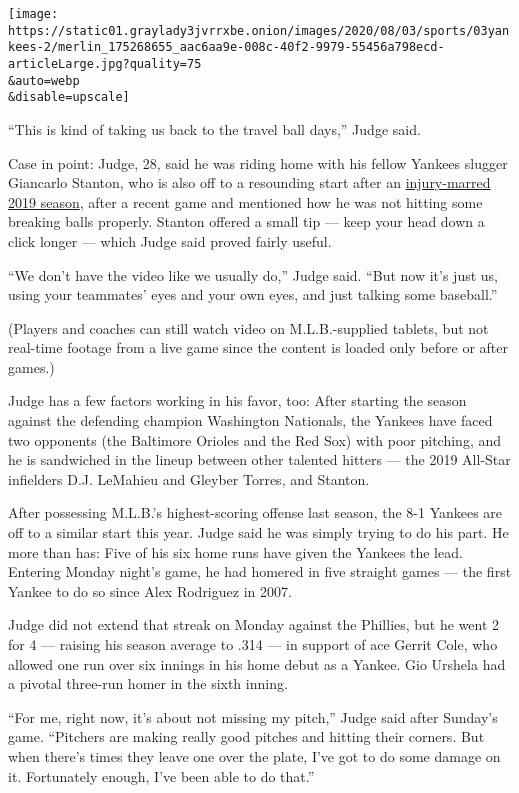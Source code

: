 \texttt{[image: https://static01.graylady3jvrrxbe.onion/images/2020/08/03/sports/03yankees-2/merlin\_175268655\_aac6aa9e-008c-40f2-9979-55456a798ecd-articleLarge.jpg?quality=75\\\&auto=webp\\\&disable=upscale]}

``This is kind of taking us back to the travel ball days,'' Judge said.

Case in point: Judge, 28, said he was riding home with his fellow
Yankees slugger Giancarlo Stanton, who is also off to a resounding start
after an
\href{https://www.nytimes3xbfgragh.onion/2019/09/18/sports/baseball/giancarlo-stanton-yankees.html}{injury-marred
2019 season}, after a recent game and mentioned how he was not hitting
some breaking balls properly. Stanton offered a small tip --- keep your
head down a click longer --- which Judge said proved fairly useful.

``We don't have the video like we usually do,'' Judge said. ``But now
it's just us, using your teammates' eyes and your own eyes, and just
talking some baseball.''

(Players and coaches can still watch video on M.L.B.-supplied tablets,
but not real-time footage from a live game since the content is loaded
only before or after games.)

Judge has a few factors working in his favor, too: After starting the
season against the defending champion Washington Nationals, the Yankees
have faced two opponents (the Baltimore Orioles and the Red Sox) with
poor pitching, and he is sandwiched in the lineup between other talented
hitters --- the 2019 All-Star infielders D.J. LeMahieu and Gleyber
Torres, and Stanton.

After possessing M.L.B.'s highest-scoring offense last season, the 8-1
Yankees are off to a similar start this year. Judge said he was simply
trying to do his part. He more than has: Five of his six home runs have
given the Yankees the lead. Entering Monday night's game, he had homered
in five straight games --- the first Yankee to do so since Alex
Rodriguez in 2007.

Judge did not extend that streak on Monday against the Phillies, but he
went 2 for 4 --- raising his season average to .314 --- in support of
ace Gerrit Cole, who allowed one run over six innings in his home debut
as a Yankee. Gio Urshela had a pivotal three-run homer in the sixth
inning.

``For me, right now, it's about not missing my pitch,'' Judge said after
Sunday's game. ``Pitchers are making really good pitches and hitting
their corners. But when there's times they leave one over the plate,
I've got to do some damage on it. Fortunately enough, I've been able to
do that.''

